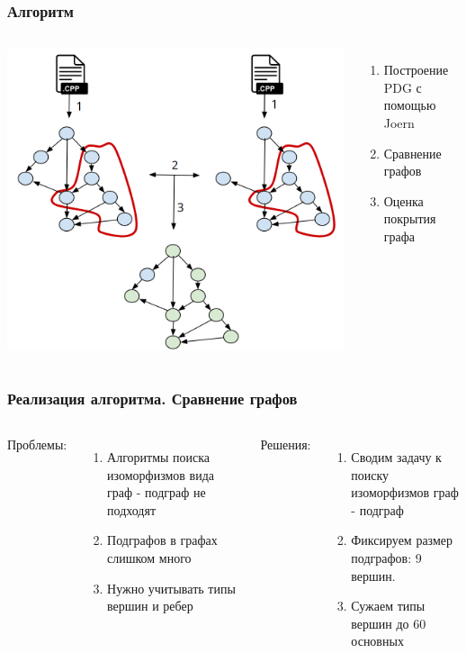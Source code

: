 \documentclass[10pt]{beamer}
\begin{document}
\begin{frame}\frametitle{Алгоритм}
	\begin{columns}
		\hspace*{-0.6cm}\includegraphics[scale=0.6]{algo.png}
		\centering
		\begin{enumerate}
			\item Построение PDG с помощью Joern
			\newline
			\item Сравнение графов
			\newline
			\newline
			\item Оценка покрытия графа
		\end{enumerate}
	\end{columns}
\end{frame}
    
\begin{frame}\frametitle{Реализация алгоритма. Сравнение графов}
	\begin{columns}[T]
	\column{0.5\textwidth}
	    Проблемы:
		\begin{enumerate}
		\item Алгоритмы поиска изоморфизмов вида граф - подграф не
		подходят
		\item Подграфов в графах слишком много
		\item Нужно учитывать типы вершин и ребер
		\end{enumerate}
	
	\column{.02\textwidth}
	
	\column{0.5\textwidth}
	Решения:
	\begin{enumerate}
	\item Сводим задачу к поиску изоморфизмов граф - подграф \newline
	\item Фиксируем размер подграфов: 9 вершин.
	\item Сужаем типы вершин до 60 основных
	\end{enumerate}
	\end{columns}
 
\end{frame}
\end{document}
